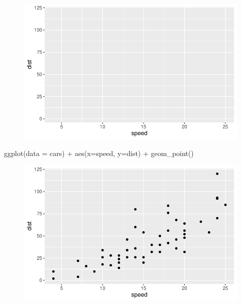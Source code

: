 \documentclass[
  letterpaper,
  DIV=11,
  numbers=noendperiod]{scrartcl}
\newenvironment{Shaded}{\begin{snugshade}}{\end{snugshade}}
\newcommand{\AttributeTok}[1]{\textcolor[rgb]{0.40,0.45,0.13}{#1}}
\newcommand{\FunctionTok}[1]{\textcolor[rgb]{0.28,0.35,0.67}{#1}}
\newcommand{\NormalTok}[1]{\textcolor[rgb]{0.00,0.23,0.31}{#1}}
\newcommand{\SpecialCharTok}[1]{\textcolor[rgb]{0.37,0.37,0.37}{#1}}
\begin{document}
\begin{figure}[H]

{\centering \includegraphics{class05_files/figure-pdf/unnamed-chunk-4-2.pdf}

}

\end{figure}

\begin{Shaded}
\begin{Highlighting}[]
 \FunctionTok{ggplot}\NormalTok{(}\AttributeTok{data =}\NormalTok{ cars) }\SpecialCharTok{+} \FunctionTok{aes}\NormalTok{(}\AttributeTok{x=}\NormalTok{speed, }\AttributeTok{y=}\NormalTok{dist) }\SpecialCharTok{+} \FunctionTok{geom\_point}\NormalTok{()}
\end{Highlighting}
\end{Shaded}

\begin{figure}[H]

{\centering \includegraphics{class05_files/figure-pdf/unnamed-chunk-4-3.pdf}

}

\end{figure}
\end{document}
